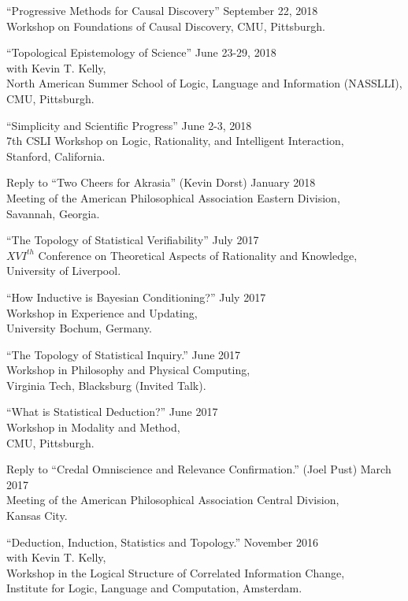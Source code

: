 \documentclass[12pt]{res} %
\begin{document}
\begin{resume}
``Progressive Methods for Causal Discovery'' \hfill September 22, 2018\\
Workshop on Foundations of Causal Discovery,
CMU, Pittsburgh.

``Topological Epistemology of Science'' \hfill June 23-29, 2018\\
with Kevin T. Kelly,\\
North American Summer School of Logic, Language and Information (NASSLLI),\\
CMU, Pittsburgh.

``Simplicity and Scientific Progress'' \hfill June 2-3, 2018\\
7th CSLI Workshop on Logic, Rationality, and Intelligent Interaction,\\
Stanford, California.

Reply to ``Two Cheers for Akrasia'' (Kevin Dorst) \hfill January 2018\\
Meeting of the American Philosophical Association Eastern Division,\\ 
Savannah, Georgia.

``The Topology of Statistical Verifiability'' \hfill July 2017\\
$XVI^{th}$ Conference on Theoretical Aspects of Rationality and Knowledge,\\
University of Liverpool. 

``How Inductive is Bayesian Conditioning?'' \hfill July 2017\\
Workshop in Experience and Updating,\\
University Bochum, Germany.

``The Topology of Statistical Inquiry.'' \hfill June 2017\\
Workshop in Philosophy and Physical Computing, \\
Virginia Tech, Blacksburg (Invited Talk).

``What is Statistical Deduction?'' \hfill June 2017\\
Workshop in Modality and Method, \\
CMU, Pittsburgh.

Reply to ``Credal Omniscience and Relevance Confirmation.'' (Joel Pust) \hfill March 2017\\
Meeting of the American Philosophical Association Central Division,\\ 
Kansas City.

``Deduction, Induction, Statistics and Topology.'' \hfill November 2016\\
with Kevin T. Kelly,\\
 Workshop in the Logical Structure of Correlated Information Change,\\ Institute for Logic, Language and Computation, Amsterdam.


\end{resume}
\end{document}
